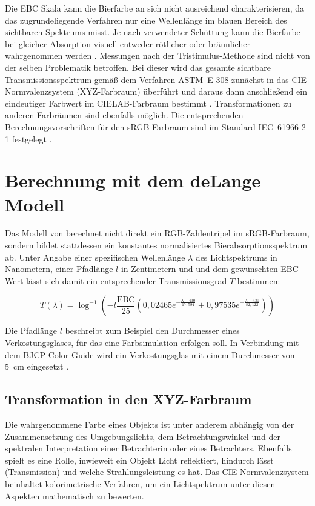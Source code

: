 \documentclass[10pt,a4paper,DIV=12,parskip=half]{scrarticle}
\begin{document}
Die EBC Skala kann die Bierfarbe an sich nicht ausreichend charakterisieren, da das zugrundeliegende Verfahren nur eine Wellenlänge im blauen Bereich des sichtbaren Spektrums misst. Je nach verwendeter Schüttung kann die Bierfarbe bei gleicher Absorption visuell entweder rötlicher oder bräunlicher wahrgenommen werden \parencite{Tucker2017}. Messungen nach der Tristimulus-Methode sind nicht von der selben Problematik betroffen. Bei dieser wird das gesamte sichtbare Transmissionsspektrum gemäß dem Verfahren ASTM~E-308 zunächst in das CIE-Normvalenzsystem (XYZ-Farbraum) überführt und daraus dann anschließend ein eindeutiger Farbwert im CIELAB-Farbraum bestimmt \parencites{deLange2016}{ASBC2011}. Transformationen zu anderen Farbräumen sind ebenfalls möglich. Die entsprechenden Berechnungsvorschriften für den sRGB-Farbraum sind im Standard IEC~61966-2-1 festgelegt \parencite{W3C2015}.

\section*{Berechnung mit dem deLange Modell}

Das Modell von \cite{deLange2016} berechnet nicht direkt ein RGB-Zahlentripel im sRGB-Farbraum, sondern bildet stattdessen ein konstantes normalisiertes Bierabsorptionsspektrum ab. Unter Angabe einer spezifischen Wellenlänge $\lambda$ des Lichtspektrums in Nanometern, einer Pfadlänge $l$ in Zentimetern und und dem gewünschten EBC Wert lässt sich damit ein entsprechender Transmissionsgrad $T$ bestimmen:

\begin{equation*}
T(\lambda)=\log^{-1}\left(-l \frac{\text{EBC}}{25} \left(0,02465e^{-\frac{\lambda-430}{17,591}}+0,97535e^{-\frac{\lambda-430}{82,122}}\right)\right)
\end{equation*}

Die Pfadlänge $l$ beschreibt zum Beispiel den Durchmesser eines Verkostungsglases, für das eine Farbsimulation erfolgen soll. In Verbindung mit dem BJCP Color Guide wird ein Verkostungsglas mit einem Durchmesser von 5~cm eingesetzt \parencite{BJCP}. 

\subsection*{Transformation in den XYZ-Farbraum}

Die wahrgenommene Farbe eines Objekts ist unter anderem abhängig von der Zusammensetzung des Umgebungslichts, dem Betrachtungswinkel und der spektralen Interpretation einer Betrachterin oder eines Betrachters. Ebenfalls spielt es eine Rolle, inwieweit ein Objekt Licht reflektiert, hindurch lässt (Transmission) und welche Strahlungsleistung es hat. Das CIE-Normvalenzsystem beinhaltet kolorimetrische Verfahren, um ein Lichtspektrum unter diesen Aspekten mathematisch zu bewerten. \parencite{ASTM2022}
\end{document}
